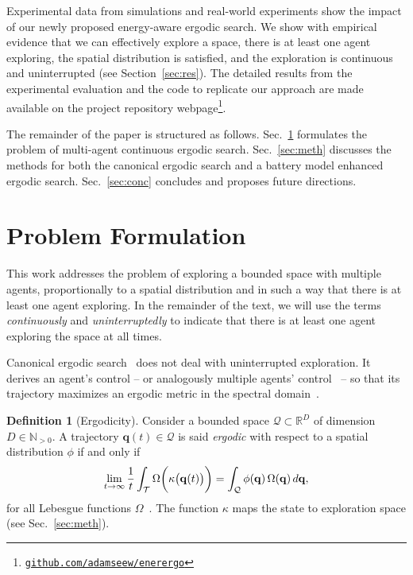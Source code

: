 \documentclass[letterpaper,10pt,conference,twoside]{IEEEtran}
\theoremstyle{definition}
\newtheorem{defn}{Definition}[section]
\begin{document}
Experimental data from simulations and real-world experiments show the impact of our newly proposed energy-aware ergodic search. We show with empirical evidence that we can effectively explore a space, %
there is %
at least one agent exploring, the spatial distribution is satisfied, and the exploration is continuous and uninterrupted (see Section~\ref{sec:res}). The detailed results from the experimental evaluation and the code to replicate our approach are made available on the project repository webpage\footnote{\label{reflink}{\tt\footnotesize\href{https://github.com/adamseew/enerergo}{github.com/adamseew/enerergo}}}.

The remainder of the paper is structured as follows. Sec.~\ref{sec:pb} formulates the problem of multi-agent continuous ergodic search. Sec.~\ref{sec:meth} discusses the methods for both the canonical ergodic search and a battery model enhanced ergodic search. Sec.~\ref{sec:conc} concludes and proposes future directions.


\section{Problem Formulation}\label{sec:pb}
\noindent
This work addresses the problem of exploring a bounded space with multiple agents, proportionally to a spatial distribution and in such a way that there is at least one agent exploring. 
%
In the remainder of the text, we will use the terms \textit{continuously} and \textit{uninterruptedly} to indicate that there is at least one agent exploring the space at all times.

Canonical ergodic search~\cite{mathew2011metrics,miller2013trajectory,abraham2021ergodic,miller2016ergodic,dressel2018optimality,torre2016ergodic,shetty2022ergodic} does not deal with uninterrupted exploration. It derives an agent's control -- or analogously multiple agents' control~\cite{prabhakar2020ergodic,coffin2022multi,lerch2023safety,abraham2018decentralized,patel2021multi} -- so that its trajectory maximizes an ergodic metric %
in the spectral domain~\cite{calinon2020mixture}.


\begin{defn}[Ergodicity]
  Consider a bounded space $\mathcal{Q}\subset\mathbb{R}^D$ of dimension $D\in\mathbb{N}_{>0}$. 
  A trajectory $\mathbf{q}(t)\in\mathcal{Q}$ is said \textit{ergodic} with respect to a spatial distribution $\phi$ if and only if
  \begin{equation}
    \lim_{t\rightarrow \infty}{\small
      \frac{1}{t}\int_{\mathcal{T}}\Omega\bigg(\kappa\big(\mathbf{q}(t)\big)\bigg)=\int_{\mathcal{Q}}\phi(\mathbf{q})\,\Omega(\mathbf{q})\,d\mathbf{q},
    }
  \end{equation}
  for all Lebesgue functions $\Omega$~\cite{mathew2011metrics}. The function $\kappa$ maps the state to exploration space (see Sec.~\ref{sec:meth}).
  \end{defn}
\end{document}
